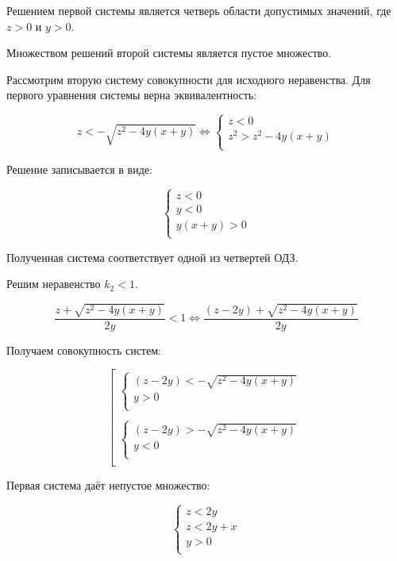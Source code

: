 Решением первой системы является четверь области допустимых значений, где $z>0$ и $y>0$.

Множеством решений второй системы является пустое множество.

Рассмотрим вторую систему совокупности для исходного неравенства. Для первого уравнения системы верна эквивалентность:

$$
z<-\sqrt{z^2-4y(x+y)} \Leftrightarrow
\left\{
\begin{array}{l}
z<0\\
z^2>z^2-4y(x+y)\\
\end{array}
\right.
$$

Решение записывается в виде:

$$
\left\{
\begin{array}{l}
 z<0\\
 y<0\\
 y(x+y)>0\\
\end{array}
\right.
$$

Полученная система соответствует одной из четвертей ОДЗ.

Решим неравенство $k_2<1$.

$$
\dfrac{z+\sqrt{z^2-4y(x+y)}}{2y}<1 \Leftrightarrow \dfrac{(z-2y)+\sqrt{z^2-4y(x+y)}}{2y}
$$

Получаем совокупность систем:

$$
\left[
\begin{array}{l}
    \left\{
        \begin{array}{l}
         (z-2y)<-\sqrt{z^2-4y(x+y)}\\
         y>0\\
        \end{array}
    \right.\\
    \\
    \left\{
        \begin{array}{l}
         (z-2y)>-\sqrt{z^2-4y(x+y)}\\
         y<0\\
        \end{array}
    \right.\\
\end{array}
\right.
$$

Первая система даёт непустое множество:

$$
\left\{
\begin{array}{l}
 z<2y\\
 z<2y+x\\
 y>0\\
\end{array}
\right.
$$

